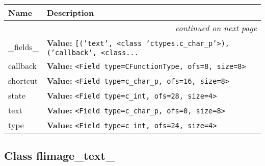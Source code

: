     \vspace{-1cm}
\hspace{\varindent}\begin{longtable}{|p{\varnamewidth}|p{\vardescrwidth}|l}
\cline{1-2}
\cline{1-2} \centering \textbf{Name} & \centering \textbf{Description}& \\
\cline{1-2}
\endhead\cline{1-2}\multicolumn{3}{r}{\small\textit{continued on next page}}\\\endfoot\cline{1-2}
\endlastfoot\raggedright \_\-f\-i\-e\-l\-d\-s\-\_\- & \raggedright \textbf{Value:} 
{\tt \texttt{[}\texttt{(}\texttt{'}\texttt{text}\texttt{'}\texttt{, }{\textless}class 'ctypes.c\_char\_p'{\textgreater}\texttt{)}\texttt{, }\texttt{(}\texttt{'}\texttt{callback}\texttt{'}\texttt{, }{\textless}class\texttt{...}}&\\
\cline{1-2}
\raggedright c\-a\-l\-l\-b\-a\-c\-k\- & \raggedright \textbf{Value:} 
{\tt {\textless}Field type=CFunctionType, ofs=8, size=8{\textgreater}}&\\
\cline{1-2}
\raggedright s\-h\-o\-r\-t\-c\-u\-t\- & \raggedright \textbf{Value:} 
{\tt {\textless}Field type=c\_char\_p, ofs=16, size=8{\textgreater}}&\\
\cline{1-2}
\raggedright s\-t\-a\-t\-e\- & \raggedright \textbf{Value:} 
{\tt {\textless}Field type=c\_int, ofs=28, size=4{\textgreater}}&\\
\cline{1-2}
\raggedright t\-e\-x\-t\- & \raggedright \textbf{Value:} 
{\tt {\textless}Field type=c\_char\_p, ofs=0, size=8{\textgreater}}&\\
\cline{1-2}
\raggedright t\-y\-p\-e\- & \raggedright \textbf{Value:} 
{\tt {\textless}Field type=c\_int, ofs=24, size=4{\textgreater}}&\\
\cline{1-2}
\end{longtable}



\subsection{Class flimage\_text\_}


